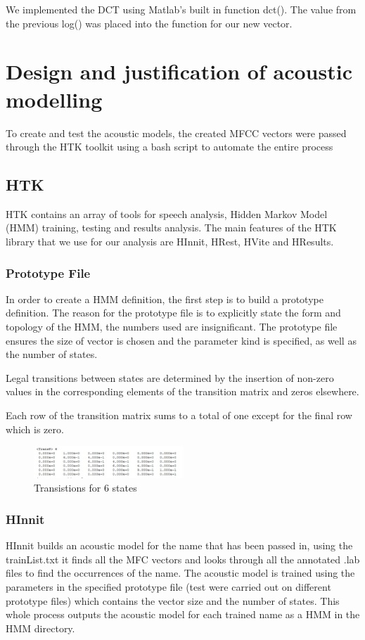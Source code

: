 \documentclass[	DIV=calc,%
							paper=a4,%
							fontsize=9.8pt,%
							twocolumn]{scrartcl}	 					%
\begin{document}
We implemented the DCT using Matlab's built in function dct(). The value from the previous log() was placed into the function for our new vector. \cite{JasonR}

\section{Design and justification of acoustic modelling}
To create and test the acoustic models, the created MFCC vectors were passed through the HTK toolkit using a bash script to automate the entire process

\subsection{HTK}
HTK contains an array of tools for speech analysis, Hidden Markov Model (HMM) training, testing and results analysis. The main features of the HTK library that we use for our analysis are HInnit, HRest, HVite and HResults.

\subsubsection{Prototype File}
In order to create a HMM definition, the first step is to build a prototype definition. 
The reason for the prototype file is to explicitly state the form and topology of the HMM, the numbers used are insignificant. The prototype file ensures the size of vector is chosen and the parameter kind is specified, as well as the number of states.

Legal transitions between states are determined by the insertion of non-zero values in the corresponding elements of the transition matrix and zeros elsewhere.
 
Each row of the transition matrix sums to a total of one except for the final row which is  zero. 

\begin{figure}[ht]
	\centering
	\includegraphics[width=0.5\textwidth]{states}
	\captionsetup{justification=centering}
	\caption{Transistions for 6 states}
\end{figure}

\subsubsection{HInnit}
HInnit builds an acoustic model for the name that has been passed in, using the trainList.txt it finds all the MFC vectors and looks through all the annotated .lab files to find the occurrences of the name. The acoustic model is trained using the parameters in the specified prototype file (test were carried out on different prototype files) which contains the vector size and the number of states. 
This whole process outputs the acoustic model for each trained name as a HMM in the HMM directory.
\end{document}

